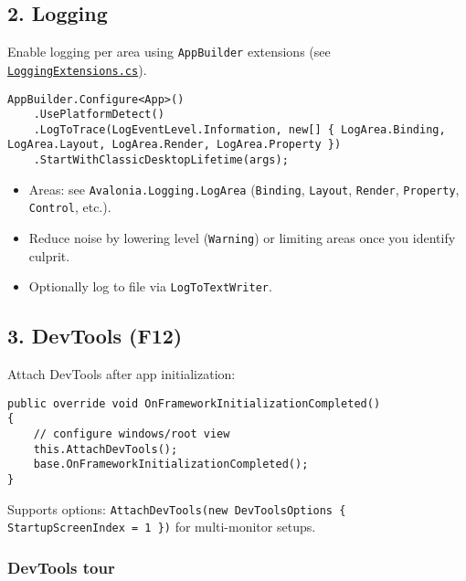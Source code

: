\subsection{2. Logging}\label{logging-1}

Enable logging per area using \passthrough{\lstinline!AppBuilder!}
extensions (see
\href{https://github.com/AvaloniaUI/Avalonia/blob/master/src/Avalonia.Controls/LoggingExtensions.cs}{\passthrough{\lstinline!LoggingExtensions.cs!}}).

\begin{lstlisting}
AppBuilder.Configure<App>()
    .UsePlatformDetect()
    .LogToTrace(LogEventLevel.Information, new[] { LogArea.Binding, LogArea.Layout, LogArea.Render, LogArea.Property })
    .StartWithClassicDesktopLifetime(args);
\end{lstlisting}

\begin{itemize}
\tightlist
\item
  Areas: see \passthrough{\lstinline!Avalonia.Logging.LogArea!}
  (\passthrough{\lstinline!Binding!}, \passthrough{\lstinline!Layout!},
  \passthrough{\lstinline!Render!}, \passthrough{\lstinline!Property!},
  \passthrough{\lstinline!Control!}, etc.).
\item
  Reduce noise by lowering level (\passthrough{\lstinline!Warning!}) or
  limiting areas once you identify culprit.
\item
  Optionally log to file via \passthrough{\lstinline!LogToTextWriter!}.
\end{itemize}

\subsection{3. DevTools (F12)}\label{devtools-f12}

Attach DevTools after app initialization:

\begin{lstlisting}
public override void OnFrameworkInitializationCompleted()
{
    // configure windows/root view
    this.AttachDevTools();
    base.OnFrameworkInitializationCompleted();
}
\end{lstlisting}

Supports options:
\passthrough{\lstinline!AttachDevTools(new DevToolsOptions \{ StartupScreenIndex = 1 \})!}
for multi-monitor setups.

\subsubsection{DevTools tour}\label{devtools-tour}

